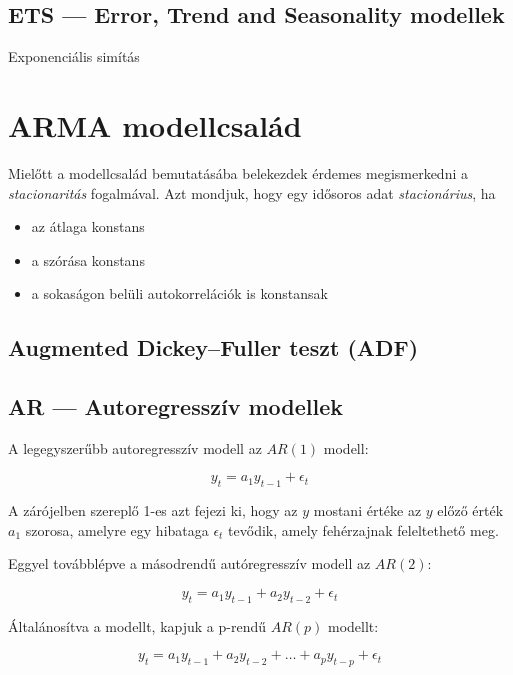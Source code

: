 \subsection{ETS --- Error, Trend and Seasonality modellek}
Exponenciális simítás

\section{ARMA modellcsalád}

Mielőtt a modellcsalád bemutatásába belekezdek érdemes megismerkedni a \emph{stacionaritás}
fogalmával. Azt mondjuk, hogy egy idősoros adat \emph{stacionárius}, ha

\begin{itemize}
    \item az átlaga konstans
    \item a szórása konstans
    \item a sokaságon belüli autokorrelációk is konstansak
\end{itemize}

\subsection{Augmented Dickey–Fuller teszt (ADF)}

\subsection{AR --- Autoregresszív modellek}

A legegyszerűbb autoregresszív modell az $AR(1)$ modell:

\begin{equation}
    y_t = a_1y_{t-1} + \epsilon_t
\end{equation}

A zárójelben szereplő 1-es azt fejezi ki, hogy az $y$ mostani értéke az $y$ előző érték $a_1$
szorosa, amelyre egy hibataga $\epsilon_t$ tevődik, amely fehérzajnak feleltethető meg.

Eggyel továbblépve a másodrendű autóregresszív modell az $AR(2)$:

\begin{equation}
    y_t = a_1y_{t-1} + a_2y_{t-2} + \epsilon_t
\end{equation}

Általánosítva a modellt, kapjuk a p-rendű $AR(p)$ modellt:

\begin{equation}
    y_t = a_1y_{t-1} + a_2y_{t-2} + \ldots + a_p y_{t-p} + \epsilon_t %
\end{equation}

